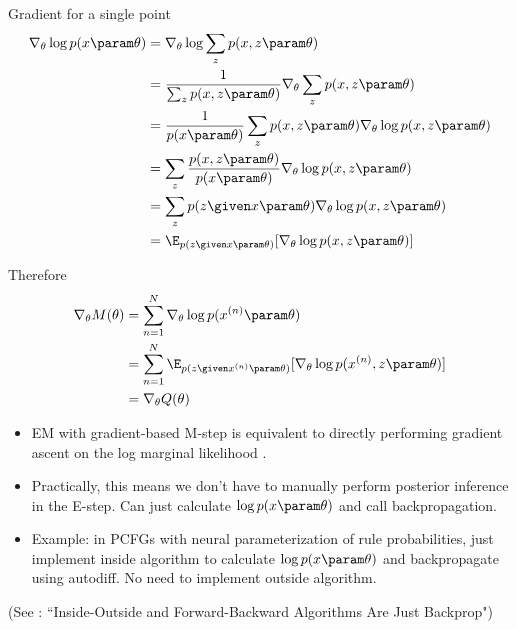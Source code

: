 \begin{frame}
\begin{center}
\end{center}
\vspace{-3mm}
Gradient for a single point
\begin{align*}
    \nabla_\theta \log p(x \param \theta) &= \nabla_\theta \log \sum_{z} p(x, z \param \theta)  \\
    &= \frac{1}{\sum_{z}p(x, z \param \theta)}\nabla_\theta \sum_{z} p(x,z \param \theta) \\
    &= \frac{1}{p(x \param \theta)} \sum_{z} p(x,z \param \theta) \nabla_\theta \log p(x, z \param \theta) \\
        &= \sum_{z}   \frac{p(x,z \param \theta)}{p(x \param \theta)} \nabla_\theta \log p(x, z \param \theta) \\
        &=  \sum_{z} p(z \given x \param \theta) \nabla_\theta \log p(x, z \param \theta) \\
        &= \E_{p(z \given x \param \theta)} [\nabla_\theta \log p(x, z \param \theta)]
\end{align*} 
\end{frame}

\begin{frame}
\begin{center}
\end{center}
\vspace{-3mm}
Therefore
\begin{align*}
    \nabla_\theta M(\theta) &= \sum_{n=1}^N  \nabla_\theta \log p(x^{(n)} \param \theta) \\
    &= \sum_{n=1}^N \E_{p(z \given x^{(n)} \param \theta)} [\nabla_\theta \log p(x^{(n)}, z \param \theta)] \\
    &= \nabla_\theta Q(\theta)
\end{align*} 
\end{frame}

\begin{frame}
\begin{center}
\end{center}
    \vspace{-2mm}
\begin{itemize}
    \item EM with gradient-based M-step is equivalent to directly performing gradient ascent on the log marginal likelihood \citep{salak2003,kirk2010}.
    \item Practically, this means we don't have to manually perform posterior inference in the E-step. Can just calculate $\log p(x \param \theta)$ and call backpropagation.
    \item Example: in PCFGs with neural parameterization of rule probabilities, just implement inside algorithm to calculate $\log p(x \param \theta)$ and backpropagate using autodiff. No need to implement outside algorithm. 
\end{itemize}
    \vspace{2mm}
    (See \cite{eisner2016}:  ``Inside-Outside and Forward-Backward Algorithms Are Just Backprop")
\end{frame}


